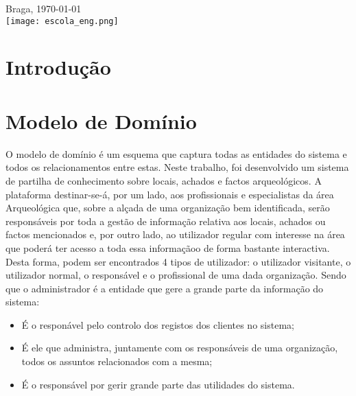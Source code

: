 \documentclass[12pt,a4paper]{article}
\begin{document}
\begin{titlepage}
Braga, {\large \today}\\[1cm] %


\texttt{[image: escola\_eng.png]}\\[0cm] %
 

\vfill %

\end{titlepage}
\thispagestyle{empty}
\newpage

\section{Introdução}


\newpage

\section{Modelo de Domínio}
O modelo de domínio é um esquema que captura todas as entidades do sistema e todos os relacionamentos entre estas. Neste trabalho, foi desenvolvido um sistema de partilha de conhecimento sobre locais, achados e factos arqueológicos. A plataforma destinar-se-á, por um lado, aos profissionais e especialistas da área Arqueológica que, sobre a alçada de uma organização bem identificada, serão responsáveis por toda a gestão de informação relativa aos locais, achados ou factos mencionados e, por outro lado, ao utilizador regular com interesse na área que poderá ter acesso a toda essa informaçãoo de forma bastante interactiva. Desta forma, podem ser encontrados 4 tipos de utilizador: o utilizador visitante, o utilizador normal, o responsável e o profissional de uma dada organização. Sendo que o administrador é a entidade que gere a grande parte da informação do sistema:\\
\begin{itemize}
\item É o responável pelo controlo dos registos dos clientes no sistema;
\item É ele que administra, juntamente com os responsáveis de uma organização, todos os assuntos relacionados com a mesma;
\item É o responsável por gerir grande parte das utilidades do sistema.
\end{itemize}
\end{document}
